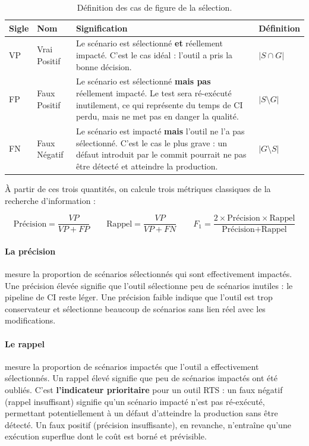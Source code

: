 \documentclass[12pt,a4paper]{article}
\begin{document}
\begin{table}[H]
\centering
\begin{tabularx}{\linewidth}{llXl}
\toprule
\textbf{Sigle} & \textbf{Nom} & \textbf{Signification} & \textbf{Définition} \\
\midrule
VP & Vrai Positif
   & Le scénario est sélectionné \textbf{et} réellement impacté.
     C'est le cas idéal : l'outil a pris la bonne décision.
   & $|S \cap G|$ \\[6pt]
FP & Faux Positif
   & Le scénario est sélectionné \textbf{mais pas} réellement impacté.
     Le test sera ré-exécuté inutilement, ce qui représente du temps
     de CI perdu, mais ne met pas en danger la qualité.
   & $|S \setminus G|$ \\[6pt]
FN & Faux Négatif
   & Le scénario est impacté \textbf{mais} l'outil ne l'a pas sélectionné.
     C'est le cas le plus grave : un défaut introduit par le commit
     pourrait ne pas être détecté et atteindre la production.
   & $|G \setminus S|$ \\
\bottomrule
\end{tabularx}
\caption{Définition des cas de figure de la sélection.}
\label{tab:vp-fp-fn}
\end{table}

À partir de ces trois quantités, on calcule trois métriques classiques
de la recherche d'information :

\begin{formulabox}
\[
  \text{Précision} = \frac{VP}{VP + FP}
  \qquad
  \text{Rappel} = \frac{VP}{VP + FN}
  \qquad
  F_1 = \frac{2 \times \text{Précision} \times \text{Rappel}}
             {\text{Précision} + \text{Rappel}}
\]
\end{formulabox}

\paragraph{La précision} mesure la proportion de scénarios sélectionnés
qui sont effectivement impactés. Une précision élevée signifie que l'outil
sélectionne peu de scénarios inutiles : le pipeline de CI reste léger.
Une précision faible indique que l'outil est trop conservateur et
sélectionne beaucoup de scénarios sans lien réel avec les modifications.

\paragraph{Le rappel} mesure la proportion de scénarios impactés que
l'outil a effectivement sélectionnés. Un rappel élevé signifie que peu
de scénarios impactés ont été oubliés. C'est \textbf{l'indicateur
prioritaire} pour un outil RTS : un faux négatif (rappel insuffisant)
signifie qu'un scénario impacté n'est pas ré-exécuté, permettant
potentiellement à un défaut d'atteindre la production sans être détecté.
Un faux positif (précision insuffisante), en revanche, n'entraîne qu'une
exécution superflue dont le coût est borné et prévisible.
\end{document}
